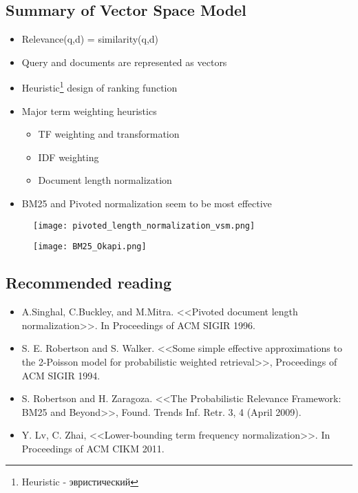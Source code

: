 \subsection{Summary of Vector Space Model}
\begin{itemize}
\item Relevance(q,d) = similarity(q,d)
\item Query and documents are represented as vectors
\item Heuristic\footnote{Heuristic - эвристический} design of ranking function

\item Major term weighting heuristics 
\begin{itemize}
\item TF weighting and transformation 
\item IDF weighting
\item Document length normalization
\end{itemize}

\item BM25 and Pivoted normalization seem to be most effective
\end{itemize}

\begin{figure}[H]
    \centering
    \texttt{[image: pivoted\_length\_normalization\_vsm.png]}
\end{figure}
\begin{figure}[H]
    \centering
    \texttt{[image: BM25\_Okapi.png]}
\end{figure}



\subsection{Recommended reading}
\begin{itemize}
\item A.Singhal, C.Buckley, and M.Mitra. <<Pivoted document length normalization>>. In Proceedings of ACM SIGIR 1996.
\item S. E. Robertson and S. Walker. <<Some simple effective approximations to the 2-Poisson model for probabilistic weighted retrieval>>, Proceedings of ACM SIGIR 1994.
\item S. Robertson and H. Zaragoza. <<The Probabilistic Relevance Framework: BM25 and Beyond>>, Found. Trends Inf. Retr. 3, 4 (April 2009).
\item Y. Lv, C. Zhai, <<Lower-bounding term frequency normalization>>. In Proceedings of ACM CIKM 2011.
\end{itemize}




